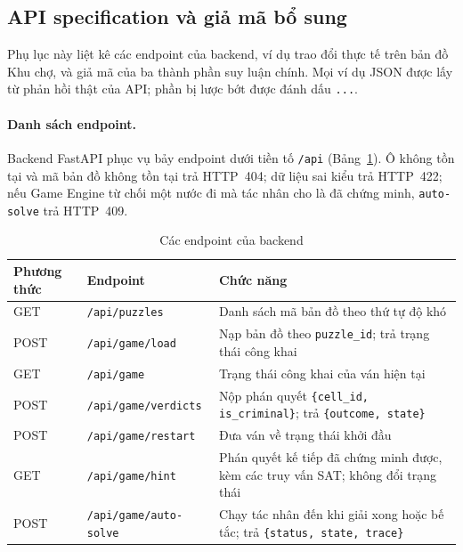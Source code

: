 \subsection{API specification và giả mã bổ sung}
\label{sec:api_pseudocode}

Phụ lục này liệt kê các endpoint của backend, ví dụ trao đổi thực tế trên bản
đồ Khu chợ, và giả mã của ba thành phần suy luận chính. Mọi ví dụ JSON được lấy
từ phản hồi thật của API; phần bị lược bớt được đánh dấu \texttt{...}.

\begin{sloppypar}
\paragraph{Danh sách endpoint.}
Backend FastAPI phục vụ bảy endpoint dưới tiền tố \nolinkurl{/api}
(Bảng~\ref{tab:api_endpoints}). Ô không tồn tại và mã bản đồ không tồn tại trả
HTTP~404; dữ liệu sai kiểu trả HTTP~422; nếu Game Engine từ chối một nước đi mà
tác nhân cho là đã chứng minh, \texttt{auto-solve} trả HTTP~409.
\end{sloppypar}

\begin{table}[htbp]
  \centering\small
  \caption{Các endpoint của backend}
  \label{tab:api_endpoints}
  \begin{tabularx}{\textwidth}{ll>{\raggedright\arraybackslash}X}
    \toprule
    \textbf{Phương thức} & \textbf{Endpoint} & \textbf{Chức năng} \\
    \midrule
    GET  & \nolinkurl{/api/puzzles}        & Danh sách mã bản đồ theo thứ tự độ khó \\
    POST & \nolinkurl{/api/game/load}      & Nạp bản đồ theo \texttt{puzzle\_id}; trả trạng thái công khai \\
    GET  & \nolinkurl{/api/game}           & Trạng thái công khai của ván hiện tại \\
    POST & \nolinkurl{/api/game/verdicts}  & Nộp phán quyết \texttt{\{cell\_id, is\_criminal\}}; trả \texttt{\{outcome, state\}} \\
    POST & \nolinkurl{/api/game/restart}   & Đưa ván về trạng thái khởi đầu \\
    GET  & \nolinkurl{/api/game/hint}      & Phán quyết kế tiếp đã chứng minh được, kèm các truy vấn SAT; không đổi trạng thái \\
    POST & \nolinkurl{/api/game/auto-solve}& Chạy tác nhân đến khi giải xong hoặc bế tắc; trả \texttt{\{status, state, trace\}} \\
    \bottomrule
  \end{tabularx}
\end{table}

